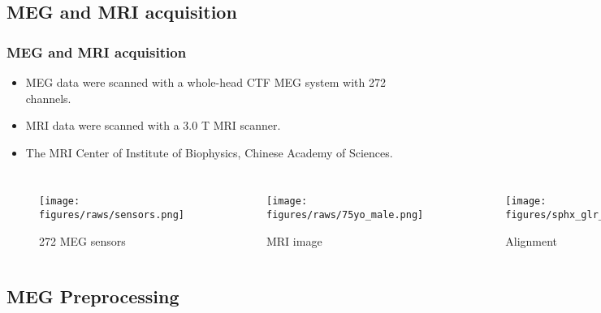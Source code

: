 \documentclass[aspectratio=169]{beamer}
\begin{document}
\subsection{MEG and MRI acquisition}

\begin{frame}
    \frametitle{MEG and MRI acquisition}

    \begin{itemize}
        \item MEG data were scanned with a whole-head CTF MEG system with 272 channels.
        \item MRI data were scanned with a 3.0 T MRI scanner.
        \item The MRI Center of Institute of Biophysics, Chinese Academy of Sciences.
    \end{itemize}

    \begin{columns}

        \begin{figure}[h]
            \centering
            \texttt{[image: figures/raws/sensors.png]}
            \caption{272 MEG sensors}
        \end{figure}


        \begin{figure}[h]
            \centering
            \texttt{[image: figures/raws/75yo\_male.png]}
            \caption{MRI image}
        \end{figure}


        \begin{figure}[h]
            \centering
            \texttt{[image: figures/sphx\_glr\_plot\_eeg\_no\_mri\_001.png]}
            \caption{Alignment}
        \end{figure}

    \end{columns}

\end{frame}

\subsection{MEG Preprocessing}
\end{document}
